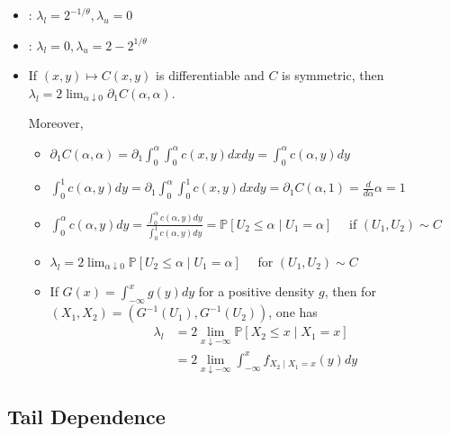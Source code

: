 \begin{itemize}[leftmargin=*]
    \item {}: $\lambda_{l}=2^{-1 / \theta}, \lambda_{u}=0$
    \item {}: $\lambda_{l}=0, \lambda_{u}=2-2^{1 / \theta}$
    
    
    \item If $(x, y) \mapsto C(x, y)$ is differentiable and $C$ is symmetric, then $\lambda_{l}=2 \lim _{\alpha \downarrow 0} \partial_{1} C(\alpha, \alpha)$.
    
Moreover,
\begin{itemize}[leftmargin=*]
    \item $\partial_{1} C(\alpha, \alpha)=\partial_{1} \int_{0}^{\alpha} \int_{0}^{\alpha} c(x, y) d x d y=\int_{0}^{\alpha} c(\alpha, y) d y$
    \item $\int_{0}^{1} c(\alpha, y) d y=\partial_{1} \int_{0}^{\alpha} \int_{0}^{1} c(x, y) d x d y=\partial_{1} C(\alpha, 1)=\frac{d}{d \alpha} \alpha=1$
    \item $\int_{0}^{\alpha} c(\alpha, y) d y=\frac{\int_{0}^{\alpha} c(\alpha, y) d y}{\int_{0}^{1} c(\alpha, y) d y}=\mathbb{P}\left[U_{2} \leq \alpha \mid U_{1}=\alpha\right] \quad$ if $\left(U_{1}, U_{2}\right) \sim C$
    \item $\lambda_{l}=2 \lim _{\alpha \downarrow 0} \mathbb{P}\left[U_{2} \leq \alpha \mid U_{1}=\alpha\right] \quad$ for $\left(U_{1}, U_{2}\right) \sim C$
    \item If $G(x)=\int_{-\infty}^{x} g(y) d y$ for a positive density $g$, then for $\left(X_{1}, X_{2}\right)=\left(G^{-1}\left(U_{1}\right), G^{-1}\left(U_{2}\right)\right)$, one has
$$
\begin{aligned}
\lambda_{l}&=2 \lim _{x \downarrow-\infty} \mathbb{P}\left[X_{2} \leq x \mid X_{1}=x\right] \\
&=2 \lim _{x \downarrow-\infty} \int_{-\infty}^{x} f_{X_{2} \mid X_{1}=x}(y) d y
\end{aligned}
$$
\end{itemize}
\end{itemize}






\subsection*{Tail Dependence}

